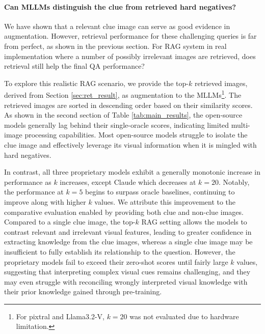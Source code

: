 
\paragraph{Can MLLMs distinguish the clue from retrieved hard negatives?}

We have shown that a relevant clue image can serve as good evidence in augmentation. However, retrieval performance for these challenging queries is far from perfect, as shown in the previous section. For RAG system in real implementation where a number of possibly irrelevant images are retrieved, does retrieval still help the final QA performance?

To explore this realistic RAG scenario, we provide the top-$k$ retrieved images, derived from Section \ref{sec:ret_result}, as augmentation to the MLLMs\footnote{For pixtral and Llama3.2-V, $k=20$ was not evaluated due to hardware limitation.}. %
The retrieved images are sorted in descending order based on their similarity scores. 
As shown in the second section of Table \ref{tab:main_results}, the open-source models generally lag behind their single-oracle scores, indicating limited multi-image processing capabilities. Most open-source models struggle to isolate the clue image and effectively leverage its visual information when it is mingled with hard negatives.


In contrast, all three proprietary models exhibit a generally monotonic increase in performance as $k$ increases, except Claude which decreases at $k=20$. Notably, the performance at $k=5$ begins to surpass oracle baselines, continuing to improve along with higher $k$ values.
We attribute this improvement to the comparative evaluation enabled by providing both clue and non-clue images. Compared to a single clue image, the top-$k$ RAG setting allows the models to contrast relevant and irrelevant visual features, leading to greater confidence in extracting knowledge from the clue images, whereas a single clue image may be insufficient to fully establish its relationship to the question. However, the proprietary models fail to exceed their zero-shot scores until fairly large $k$ values, suggesting that interpreting complex visual cues remains challenging, and they may even struggle with reconciling wrongly interpreted visual knowledge with their prior knowledge gained through pre-training.


